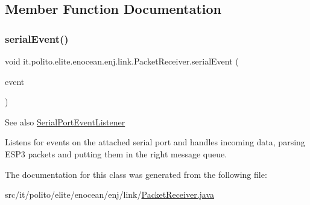 \subsection{Member Function Documentation}
\hypertarget{classit_1_1polito_1_1elite_1_1enocean_1_1enj_1_1link_1_1_packet_receiver_a1477aa10b867d41deddc025f5d8850dc}{}\label{classit_1_1polito_1_1elite_1_1enocean_1_1enj_1_1link_1_1_packet_receiver_a1477aa10b867d41deddc025f5d8850dc} 
\subsubsection{\texorpdfstring{serial\+Event()}{serialEvent()}}
{\footnotesize\ttfamily void it.\+polito.\+elite.\+enocean.\+enj.\+link.\+Packet\+Receiver.\+serial\+Event (\begin{DoxyParamCaption}\item[{Serial\+Port\+Event}]{event }\end{DoxyParamCaption})}

\begin{DoxySeeAlso}{See also}
\hyperlink{}{Serial\+Port\+Event\+Listener} \begin{DoxyVerb} Listens for events on the attached serial port and handles incoming
 data, parsing ESP3 packets and putting them in the right message
 queue.\end{DoxyVerb}
 
\end{DoxySeeAlso}


The documentation for this class was generated from the following file\+:\begin{DoxyCompactItemize}
\item 
src/it/polito/elite/enocean/enj/link/\hyperlink{_packet_receiver_8java}{Packet\+Receiver.\+java}\end{DoxyCompactItemize}
